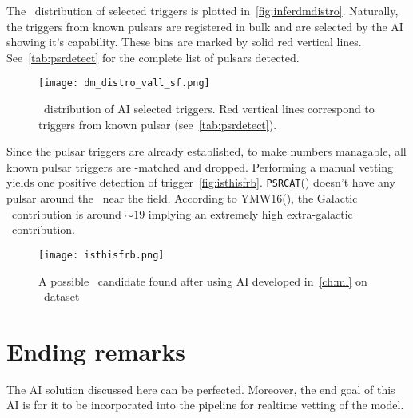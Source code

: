 \par The \dm~distribution of selected triggers is plotted in~\autoref{fig:inferdmdistro}. 
Naturally, the triggers from known pulsars are registered in bulk and are selected by the AI showing it's capability.
These bins are marked by solid red vertical lines. See~\autoref{tab:psrdetect} for the complete list of pulsars detected.

\begin{figure}
	\label{fig:inferdmdistro}
	\centering
	\texttt{[image: dm\_distro\_vall\_sf.png]}
	\caption{\dm~distribution of AI selected triggers. Red vertical lines correspond to triggers from known pulsar (see~\autoref{tab:psrdetect}).}
\end{figure}

\par Since the pulsar triggers are already established, to make numbers managable, all known pulsar triggers are \dm-matched and dropped.
Performing a manual vetting yields one positive detection of trigger~\autoref{fig:isthisfrb}.
\texttt{PSRCAT}(\cite{psrcat}) doesn't have any pulsar around the \dm~near the field.
According to YMW16(\cite{ymw16}), the Galactic \dm~contribution is around $\sim 19$ implying an extremely high extra-galactic \dm~contribution.

\begin{figure}
	\label{fig:isthisfrb}
	\centering
	\texttt{[image: isthisfrb.png]}
	\caption{A possible \frb~candidate found after using AI developed in~\autoref{ch:ml} on \vfps~dataset}
\end{figure}

\section{Ending remarks}

\par The AI solution discussed here can be perfected. Moreover, the end goal of this AI is for it to be incorporated into the \vf pipeline for realtime vetting of the model.

